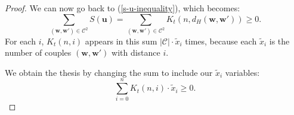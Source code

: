 \begin{lemma}
\begin{proof}
        We can now go back to (\ref{s-u-inequality}), which becomes:
        \begin{equation*}
            \sum_{(\mathbf{w}, \mathbf{w}')\in\mathcal{C}^2}S(\mathbf{u}) = \sum_{(\mathbf{w}, \mathbf{w}')\in\mathcal{C}^2}K_t(n,d_H(\mathbf{w}, \mathbf{w}')) \geq 0.
        \end{equation*}
        For each $i$, $K_t(n,i)$ appears in this sum $|\mathcal{C}|\cdot \tilde{x}_i$ times, because each $\tilde{x}_i$ is the number of couples $(\mathbf{w}, \mathbf{w}')$ with distance $i$. 

        We obtain the thesis by changing the sum to include our $\tilde{x}_i$ variables:
        \begin{equation*}
            \sum_{i=0}^{n}K_t(n,i)\cdot\tilde{x}_i \geq 0.
        \end{equation*}
    \end{proof}
\end{lemma}
